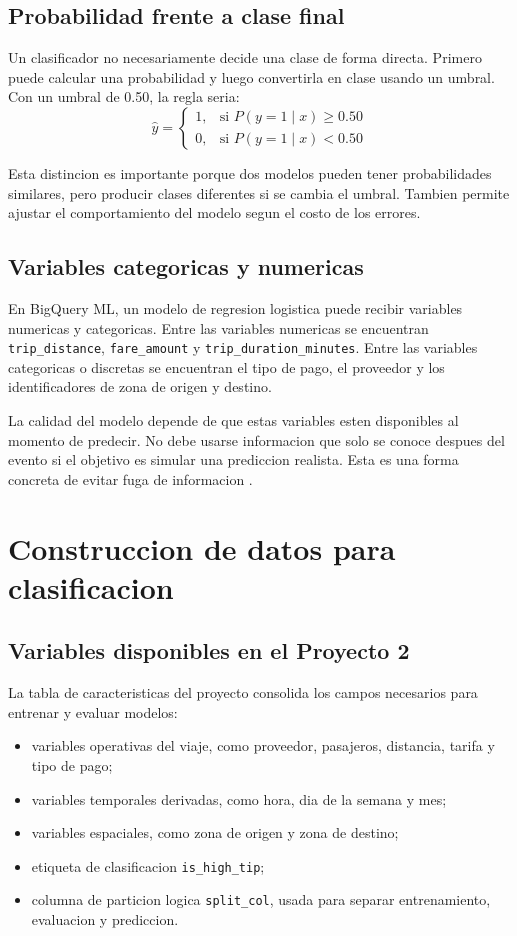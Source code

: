 \documentclass[12pt]{article}
\begin{document}
\subsection{Probabilidad frente a clase final}
Un clasificador no necesariamente decide una clase de forma directa. Primero puede calcular una probabilidad y luego convertirla en clase usando un umbral. Con un umbral de 0.50, la regla seria:
\[
\hat{y} =
\begin{cases}
1, & \text{si } P(y = 1 \mid x) \geq 0.50\\
0, & \text{si } P(y = 1 \mid x) < 0.50
\end{cases}
\]

Esta distincion es importante porque dos modelos pueden tener probabilidades similares, pero producir clases diferentes si se cambia el umbral. Tambien permite ajustar el comportamiento del modelo segun el costo de los errores.

\subsection{Variables categoricas y numericas}
En BigQuery ML, un modelo de regresion logistica puede recibir variables numericas y categoricas. Entre las variables numericas se encuentran \texttt{trip\_distance}, \texttt{fare\_amount} y \texttt{trip\_duration\_minutes}. Entre las variables categoricas o discretas se encuentran el tipo de pago, el proveedor y los identificadores de zona de origen y destino.

La calidad del modelo depende de que estas variables esten disponibles al momento de predecir. No debe usarse informacion que solo se conoce despues del evento si el objetivo es simular una prediccion realista. Esta es una forma concreta de evitar fuga de informacion \cite{google_overfitting,gcp_bqml_eval_overview}.

\section{Construccion de datos para clasificacion}
\subsection{Variables disponibles en el Proyecto 2}
La tabla de caracteristicas del proyecto consolida los campos necesarios para entrenar y evaluar modelos:
\begin{itemize}[leftmargin=*]
\item variables operativas del viaje, como proveedor, pasajeros, distancia, tarifa y tipo de pago;
\item variables temporales derivadas, como hora, dia de la semana y mes;
\item variables espaciales, como zona de origen y zona de destino;
\item etiqueta de clasificacion \texttt{is\_high\_tip};
\item columna de particion logica \texttt{split\_col}, usada para separar entrenamiento, evaluacion y prediccion.
\end{itemize}
\end{document}
